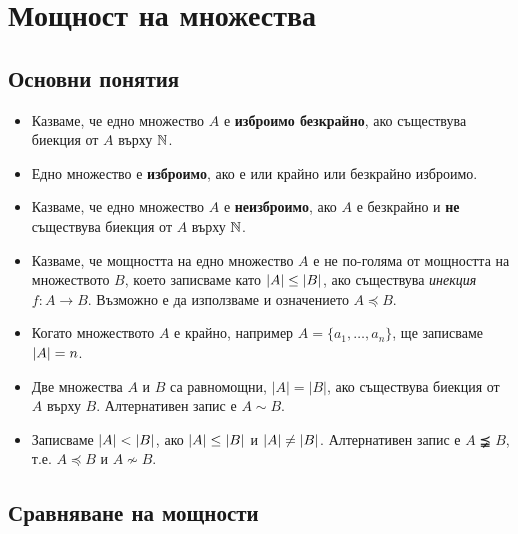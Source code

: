 \chapter{Мощност на множества}

\section{Основни понятия}

\begin{itemize}
\item 
  Казваме, че едно множество $A$ е {\bf изброимо безкрайно}, ако съществува 
  биекция от $A$ върху $\mathbb{N}$.
\item
  Едно множество е {\bf изброимо}, ако е или крайно или безкрайно изброимо.
\item
  Казваме, че едно множество $A$ е {\bf неизброимо}, ако $A$ е безкрайно и {\bf не} съществува 
  биекция от $A$ върху $\mathbb{N}$.
\item
  Казваме, че мощността на едно множество $A$ е не по-голяма от мощността на множеството $B$, 
  което записваме като $\lvert{A}\rvert \leq \lvert{B}\rvert$, ако съществува {\em инекция} $f:A \to B$.
  Възможно е да използваме и означението $A \preceq B$.
\item
  Когато множеството $A$ е крайно, например $A = \{a_1,\dots,a_n\}$, 
  ще записваме $\lvert{A}\rvert = n$.
\item
  Две множества $A$ и $B$ са равномощни, $|A| = |B|$, ако съществува биекция от $A$ върху $B$.
  Алтернативен запис е $A \sim B$.
\item
  Записваме $\lvert{A}\rvert < \lvert{B}\rvert$, ако $\lvert{A}\rvert \leq \lvert{B}\rvert$ и $\lvert{A}\rvert \neq \lvert{B}\rvert$.
  Алтернативен запис е $A \precneqq B$, т.е. $A \preceq B$ и $A \not\sim B$.
\end{itemize}


\section{Сравняване на мощности}


